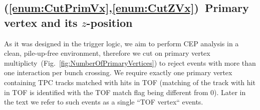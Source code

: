 \subsection{(\ref{enum:CutPrimVx},\ref{enum:CutZVx})~Primary vertex and its \texorpdfstring{$z$}{z}-position}
As it was designed in the trigger logic, we aim to perform CEP analysis in a clean, pile-up-free environment, therefore we cut on primary vertex multiplicty~(Fig.~\ref{fig:NumberOfPrimaryVertices}) to reject events with more than one interaction per bunch crossing. We require exactly one primary vertex containing TPC tracks matched with hits in TOF (matching of the track with hit in TOF is identified with the TOF match flag being different from 0). Later in the text we refer to such events as a single ``TOF vertex`` events.

